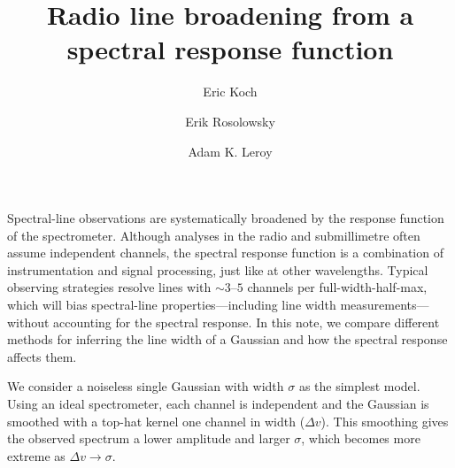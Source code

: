 \documentclass{rnaastex}
\begin{document}
\title{Radio line broadening from a spectral response function}

\author[0000-0001-9605-780X]{Eric Koch}
\author[0000-0002-5204-2259]{Erik Rosolowsky}
\author[0000-0002-2545-1700]{Adam K. Leroy}




\section{}

Spectral-line observations are systematically broadened by the response function of the spectrometer. Although analyses in the radio and submillimetre often assume independent channels, the spectral response function is a combination of instrumentation and signal processing, just like at other wavelengths.  Typical observing strategies resolve lines with $\sim3\mbox{--}5$ channels per full-width-half-max, which will bias spectral-line properties---including line width measurements--- without accounting for the spectral response.  In this note, we compare different methods for inferring the line width of a Gaussian and how the spectral response affects them.

We consider a noiseless single Gaussian with width $\sigma$ as the simplest model. Using an ideal spectrometer, each channel is independent and the Gaussian is smoothed with a top-hat kernel one channel in width ($\Delta v$). This smoothing gives the observed spectrum a lower amplitude and larger $\sigma$, which becomes more extreme as $\Delta v \rightarrow \sigma$.
\end{document}
